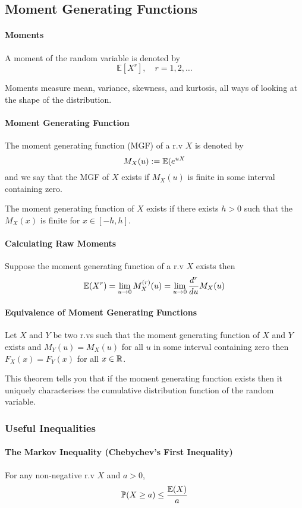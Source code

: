 \subsection{Moment Generating Functions}
\paragraph{Moments}
A moment of the random variable is denoted by
\[ \mathbb{E}[X^r], \quad r = 1, 2, \dots \]

Moments measure mean, variance, skewness, and kurtosis, all ways of looking at the shape of the distribution.

\paragraph{Moment Generating Function}
The moment generating function (MGF) of a r.v \(X\) is denoted by 
\[M_X(u) := \mathbb{E}(e^{uX}\]
and we say that the MGF of \(X\) exists if \(M_X(u)\) is finite in some interval containing zero.

The moment generating function of \(X\) exists if there exists \(h > 0\) such that the \(M_X(x)\) is finite for \(x \in [-h,h]\).

\paragraph{Calculating Raw Moments}
Suppose the moment generating function of a r.v \(X\) exists then 
\[\mathbb{E}(X^r) = \lim_{u \to 0} M_X^{(r)}(u) = \lim_{u \to 0} \frac{d^r}{du}M_X(u)\]

\paragraph{Equivalence of Moment Generating Functions}
Let \(X\) and \(Y\) be two r.vs such that the moment generating function of \(X\) and \(Y\) exists and \(M_Y(u) = M_X(u)\) for all \(u\) in some interval containing zero then \(F_X(x) = F_Y(x)\) for all \(x \in \mathbb{R}\).

This theorem tells you that if the moment generating function exists then it uniquely characterises the cumulative distribution function of the random variable.

\subsubsection{Useful Inequalities}
\paragraph{The Markov Inequality (Chebychev's First Inequality)}
For any non-negative r.v \(X\) and \(a > 0\),
\[\mathbb{P}(X \geq a) \leq \frac{\mathbb{E}(X)}{a}\]

